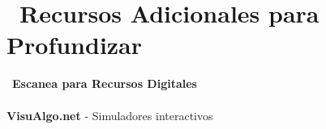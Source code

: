 \documentclass[12pt,a4paper]{article}
\begin{document}
	\newpage
	
	\section*{\faBookmark\ Recursos Adicionales para Profundizar}
	
	\begin{center}
		\begin{tcolorbox}[colback=primaryblue!10, colframe=primaryblue, rounded corners]
			\centering
			\Large\faQrcode\ \textbf{Escanea para Recursos Digitales}\\[0.5cm]
			\\[0.3cm]
			\normalsize\textbf{VisuAlgo.net} - Simuladores interactivos
		\end{tcolorbox}
	\end{center}
	
\end{document}
